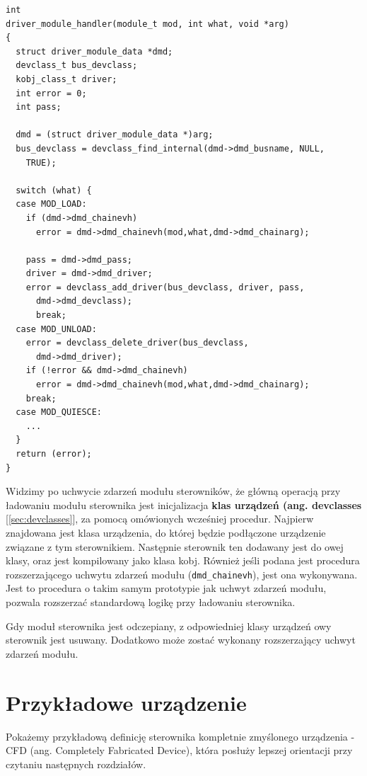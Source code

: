 \documentclass[shortabstract,inz]{iithesis}
\begin{document}
\begin{lstlisting}
int
driver_module_handler(module_t mod, int what, void *arg)
{
  struct driver_module_data *dmd;
  devclass_t bus_devclass;
  kobj_class_t driver;
  int error = 0;
  int pass;

  dmd = (struct driver_module_data *)arg;
  bus_devclass = devclass_find_internal(dmd->dmd_busname, NULL, 
    TRUE);
    
  switch (what) {
  case MOD_LOAD:
    if (dmd->dmd_chainevh)
      error = dmd->dmd_chainevh(mod,what,dmd->dmd_chainarg);

    pass = dmd->dmd_pass;
    driver = dmd->dmd_driver;
    error = devclass_add_driver(bus_devclass, driver, pass, 
      dmd->dmd_devclass);
      break;
  case MOD_UNLOAD:
    error = devclass_delete_driver(bus_devclass, 
      dmd->dmd_driver);
    if (!error && dmd->dmd_chainevh)
      error = dmd->dmd_chainevh(mod,what,dmd->dmd_chainarg);
    break;
  case MOD_QUIESCE:
    ...
  }
  return (error);
}
\end{lstlisting}

Widzimy po uchwycie zdarzeń modułu sterowników, że główną operacją przy ładowaniu modułu sterownika
jest inicjalizacja \textbf{klas urządzeń (ang. devclasses} [\ref{sec:devclasses}], za pomocą
omówionych wcześniej procedur.
Najpierw znajdowana jest klasa urządzenia,
do której będzie podłączone urządzenie związane z tym sterownikiem. Następnie
sterownik ten dodawany jest do owej klasy, oraz jest kompilowany jako klasa kobj.
Również jeśli podana jest procedura rozszerzającego uchwytu zdarzeń modułu (\texttt{dmd\_chainevh}), 
jest ona wykonywana. Jest to procedura o takim samym prototypie jak uchwyt zdarzeń modułu, pozwala
rozszerzać standardową logikę przy ładowaniu sterownika.

Gdy moduł sterownika jest odczepiany, z odpowiedniej klasy urządzeń owy sterownik
jest usuwany. Dodatkowo może zostać wykonany rozszerzający uchwyt zdarzeń modułu.




\section{Przykładowe urządzenie} %

Pokażemy przykładową definicję sterownika kompletnie zmyślonego urządzenia - CFD (ang. Completely Fabricated Device),
która posłuży lepszej orientacji przy czytaniu następnych rozdziałów.
\end{document}
